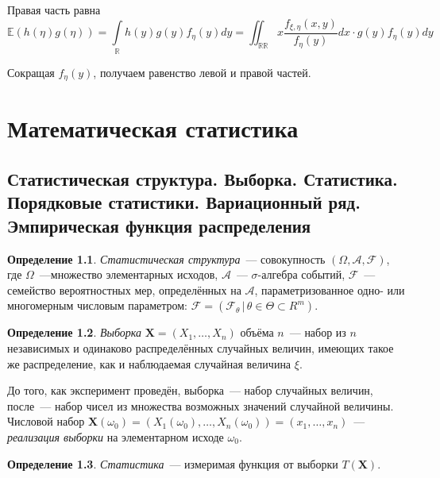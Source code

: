 \documentclass[oneside,final,14pt]{extreport}
\theoremstyle{definition}
\newtheorem{defn}{Определение}[section]
\begin{document}
    Правая часть равна
    \begin{equation*}
        \mathbb{E}(h(\eta) g(\eta))=\int\limits_{\mathbb{R}} h(y) g(y) f_{\eta}(y) d y=\iint_{\mathbb{R} \mathbb{R}} x \frac{f_{\xi, \eta}(x, y)}{f_{\eta}(y)} d x \cdot g(y) f_{\eta}(y) d y
    \end{equation*}
    
    Сокращая $f_{\eta}(y)$, получаем равенство левой и правой частей.
    
\chapter{Математическая статистика}

\section{Статистическая структура. Выборка. Статистика. Порядковые статистики. Вариационный ряд. Эмпирическая функция распределения}

\begin{defn}
{\it Статистическая структура}~--- совокупность $(\Omega, \mathcal{A}, \mathcal{F})$, где $\Omega$~---множество элементарных исходов, $\mathcal{A}$~--- $\sigma$-алгебра событий, $\mathcal{F}$~--- семейство вероятностных мер, определённых на $\mathcal{A}$, параметризованное одно- или многомерным числовым параметром: $\mathcal{F} = (\mathcal{F}_{\theta}\,|\,\theta \in \Theta \subset R^{m})$.
\end{defn}

\begin{defn}
{\it Выборка} $\mathbf{X} = (X_{1}, \ldots, X_{n})$ объёма $n$~--- набор из $n$ независимых и одинаково распределённых случайных величин, имеющих такое же распределение, как и наблюдаемая случайная величина $\xi$.
\end{defn}

До того, как эксперимент проведён, выборка~--- набор случайных величин, после~--- набор чисел из множества возможных значений случайной величины. Числовой набор $\mathbf{X}(\omega_0) = (X_{1}(\omega_0), \ldots, X_{n}(\omega_0)) = (x_1, \ldots, x_n)$~--- {\it реализация выборки} на элементарном исходе $\omega_0$.

\begin{defn}
{\it Статистика}~--- измеримая функция от выборки $T(\mathbf{X})$.
\end{defn}
\end{document}
